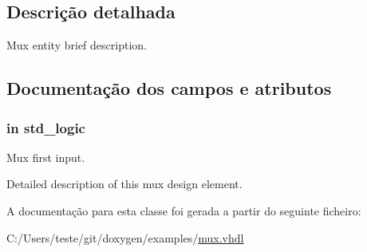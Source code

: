 \subsection{Descrição detalhada}
Mux entity brief description. 

\subsection{Documentação dos campos e atributos}
\hypertarget{classmux__using__with_a9e076453aeaf245e322b6cb7ce164dd0}{
\subsubsection[{din\-\_\-0}]{ {\bfseries \textcolor{vhdlkeyword}{in}\textcolor{vhdlchar}{ }} {\bfseries \textcolor{comment}{std\-\_\-logic}\textcolor{vhdlchar}{ }} \hspace{0.3cm}{\ttfamily [Port]}}}\label{classmux__using__with_a9e076453aeaf245e322b6cb7ce164dd0}


Mux first input. 

Detailed description of this mux design element. 

A documentação para esta classe foi gerada a partir do seguinte ficheiro\-:\begin{DoxyCompactItemize}
\item 
C\-:/\-Users/teste/git/doxygen/examples/\hyperlink{mux_8vhdl}{mux.\-vhdl}\end{DoxyCompactItemize}
